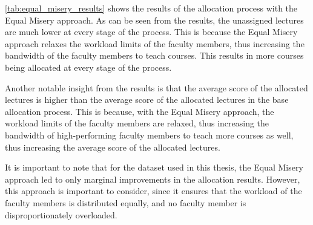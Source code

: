 \begin{table}[H]
  \centering
  \caption{Experimental Results of Equal Misery}
  \label{tab:equal_misery_results}
\end{table}

\autoref{tab:equal_misery_results} shows the results of the allocation process with the Equal Misery approach. As can be seen from the results, the unassigned lectures are much lower at every stage of the process. This is because the Equal Misery approach relaxes the workload limits of the faculty members, thus increasing the bandwidth of the faculty members to teach courses. This results in more courses being allocated at every stage of the process.

Another notable insight from the results is that the average score of the allocated lectures is higher than the average score of the allocated lectures in the base allocation process. This is because, with the Equal Misery approach, the workload limits of the faculty members are relaxed, thus increasing the bandwidth of high-performing faculty members to teach more courses as well, thus increasing the average score of the allocated lectures.

It is important to note that for the dataset used in this thesis, the Equal Misery approach led to only marginal improvements in the allocation results. However, this approach is important to consider, since it ensures that the workload of the faculty members is distributed equally, and no faculty member is disproportionately overloaded.


